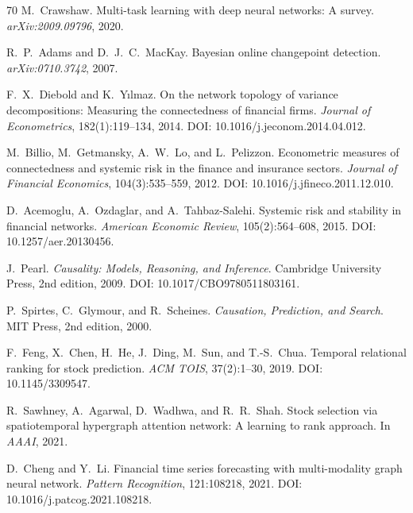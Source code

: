\documentclass[11pt]{article}
\begin{document}
\begin{thebibliography}{70}
M.~Crawshaw.
\newblock Multi-task learning with deep neural networks: A survey.
\newblock \emph{arXiv:2009.09796}, 2020.

R.~P.~Adams and D.~J.~C.~MacKay.
\newblock Bayesian online changepoint detection.
\newblock \emph{arXiv:0710.3742}, 2007.


F.~X.~Diebold and K.~Y{\i}lmaz.
\newblock On the network topology of variance decompositions: Measuring the connectedness of financial firms.
\newblock \emph{Journal of Econometrics}, 182(1):119--134, 2014. DOI: 10.1016/j.jeconom.2014.04.012.

M.~Billio, M.~Getmansky, A.~W.~Lo, and L.~Pelizzon.
\newblock Econometric measures of connectedness and systemic risk in the finance and insurance sectors.
\newblock \emph{Journal of Financial Economics}, 104(3):535--559, 2012. DOI: 10.1016/j.jfineco.2011.12.010.

D.~Acemoglu, A.~Ozdaglar, and A.~Tahbaz-Salehi.
\newblock Systemic risk and stability in financial networks.
\newblock \emph{American Economic Review}, 105(2):564--608, 2015. DOI: 10.1257/aer.20130456.

J.~Pearl.
\newblock \emph{Causality: Models, Reasoning, and Inference}.
\newblock Cambridge University Press, 2nd edition, 2009.
\newblock DOI: 10.1017/CBO9780511803161.

P.~Spirtes, C.~Glymour, and R.~Scheines.
\newblock \emph{Causation, Prediction, and Search}.
\newblock MIT Press, 2nd edition, 2000.

F.~Feng, X.~Chen, H.~He, J.~Ding, M.~Sun, and T.-S.~Chua.
\newblock Temporal relational ranking for stock prediction.
\newblock \emph{ACM TOIS}, 37(2):1--30, 2019. DOI: 10.1145/3309547.

R.~Sawhney, A.~Agarwal, D.~Wadhwa, and R.~R.~Shah.
\newblock Stock selection via spatiotemporal hypergraph attention network: A learning to rank approach.
\newblock In \emph{AAAI}, 2021.

D.~Cheng and Y.~Li.
\newblock Financial time series forecasting with multi-modality graph neural network.
\newblock \emph{Pattern Recognition}, 121:108218, 2021. DOI: 10.1016/j.patcog.2021.108218.


\end{thebibliography}
\end{document}
